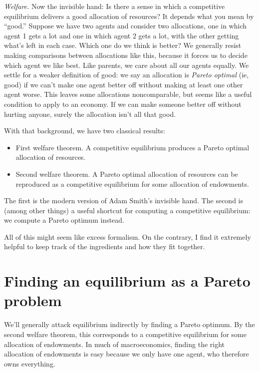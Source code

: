 \documentclass[11pt]{article}
\begin{document}
{\it Welfare.\/}  Now the invisible hand:
Is there a sense in which a competitive equilibrium delivers a
good allocation of resources?
It depends what you mean by ``good.''
Suppose we have two agents and consider two allocations,
one in which agent 1 gets a lot and one in which agent 2 gets a lot,
with the other getting what's left in each case.
Which one do we think is better?
We generally resist making comparisons between allocations like
this, because it forces us to decide which agent we like best.
Like parents, we care about all our agents equally.
We settle for a weaker definition of good:
we say an allocation is {\it Pareto optimal\/} (ie, good)
if we can't make one agent better off without making at least one
other agent worse.
This leaves some allocations noncomparable,
but seems like a useful condition to apply to an economy.
If we can make someone better off without hurting anyone,
surely the allocation isn't all that good.

With that background, we have two classical results:
%
\begin{itemize}
\item First welfare theorem.  A competitive equilibrium produces
a Pareto optimal allocation of resources.
\item Second welfare theorem.
A Pareto optimal allocation of resources can be reproduced
as a competitive equilibrium for some allocation
of endowments.
\end{itemize}
The first is the modern version of Adam Smith's invisible hand.
The second is (among other things) a useful shortcut for computing
a competitive equilibrium:  we compute a Pareto optimum instead.

All of this might seem like excess formalism.
On the contrary, I find it extremely helpful to keep track
of the ingredients and how they fit together.


\section{Finding an equilibrium as a Pareto problem}


We'll generally attack equilibrium indirectly by finding a Pareto optimum.
By the second welfare theorem, this corresponds to a competitive equilibrium for some
allocation of endowments.
In much of macroeconomics, finding the right allocation of endowments is easy
because we only have one agent, who therefore owns everything.
\end{document}
